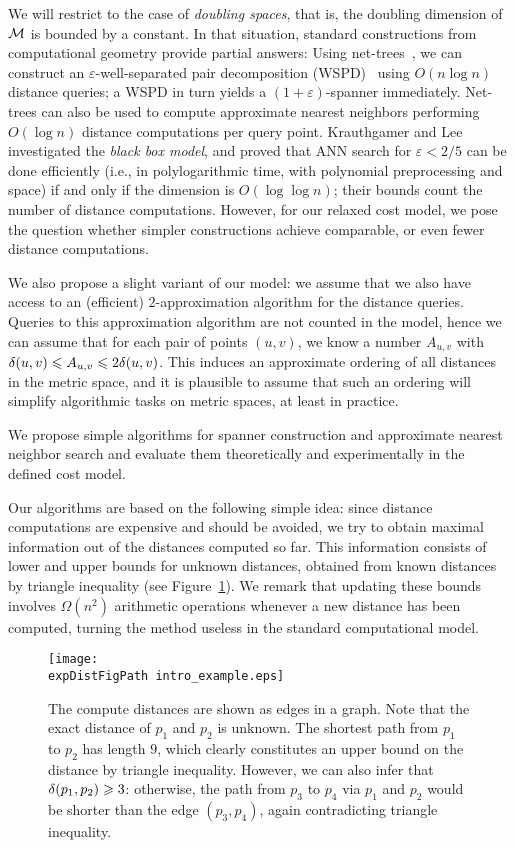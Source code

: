 \documentclass{ws-ijcga}
\renewcommand{\leq}{\leqslant}
\renewcommand{\geq}{\geqslant}
\newcommand{\eps}{\varepsilon}
\def \expDistFigPath {pics/}
\begin{document}
We will restrict to the case of \emph{doubling spaces}, that is, the doubling dimension
of $\mathcal{M}$ is bounded by a constant. 
In that situation, standard constructions from computational geometry provide partial answers:
Using net-trees~\cite{hm-fast}, we can construct an $\eps$-well-separated pair decomposition (WSPD)~\cite{CK-decomposition} using $O(n\log n)$ distance queries; a WSPD in turn yields
a {$(1+\eps)$-spanner} immediately. Net-trees can also be used to compute approximate nearest neighbors
performing $O(\log n)$ distance computations per query point.
Krauthgamer and Lee \cite{krauthgamer2005black} investigated the \textit{black box model},
and proved that ANN search for $\eps < 2/5$ can be done efficiently (i.e., in polylogarithmic time, with polynomial preprocessing
and space) if and only if the dimension is $O(\log \log n)$; their bounds count the number of distance computations.
However, for our relaxed cost model, we pose the question whether simpler constructions achieve
comparable, or even fewer distance computations.

We also propose a slight variant of our model: we assume that we also have access to an (efficient)
$2$-approximation algorithm for the distance queries. Queries to this approximation algorithm
are not counted in the model, hence we can assume that for each pair of points $(u,v)$, we
know a number $A_{u,v}$ with $\dist(u,v)\leq A_{u,v}\leq 2\dist(u,v)$. This induces an approximate ordering
of all distances in the metric space, and it is plausible to assume that such an ordering will simplify
algorithmic tasks on metric spaces, at least in practice.

%
We propose simple algorithms for spanner construction and approximate nearest neighbor search
and evaluate them theoretically and experimentally in the defined cost model.

Our algorithms are based on the following simple idea: since distance computations are expensive
and should be avoided, we try to obtain maximal information out of the distances computed
so far. 
This information consists of lower and upper bounds for unknown distances, obtained from known distances
by triangle inequality (see Figure~\ref{fig:1st_example}). We remark that updating these bounds involves $\Omega(n^2)$ arithmetic
operations whenever a new distance has been computed, turning the method useless in the standard computational model.

\begin{figure}[h]
\centering
\texttt{[image: \\expDistFigPath  intro\_example.eps]}
\caption{The compute distances are shown as edges in a graph. Note that the exact distance
of $p_1$ and $p_2$ is unknown. The shortest path from $p_1$ to $p_2$ has length $9$, which clearly
constitutes an upper bound on the distance by triangle inequality.
However, we can also infer that $\dist(p_1,p_2)\geq 3$:
otherwise, the path from $p_3$ to $p_4$ via $p_1$ and $p_2$
would be shorter than the edge $(p_3,p_4)$, again contradicting
triangle inequality.}
\label{fig:1st_example}
\end{figure}
\end{document}
